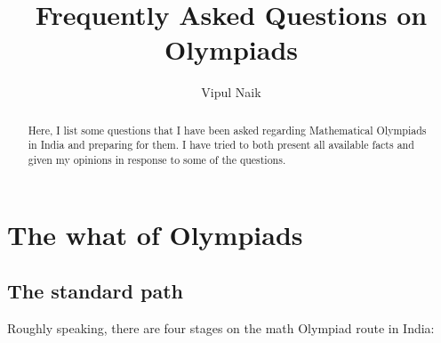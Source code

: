 \documentclass[a4paper]{amsart}
\title{Frequently Asked Questions on Olympiads}
\author{Vipul Naik}
\begin{document}
\maketitle

\begin{abstract}
  Here, I list some questions that I have been asked regarding
  Mathematical Olympiads in India and preparing for them. I have tried
  to both present all available facts and given my opinions in response
  to some of the questions.
\end{abstract}

\section{The what of Olympiads}

\subsection{The standard path}

Roughly speaking, there are four stages on the math Olympiad route in India:
\end{document}
